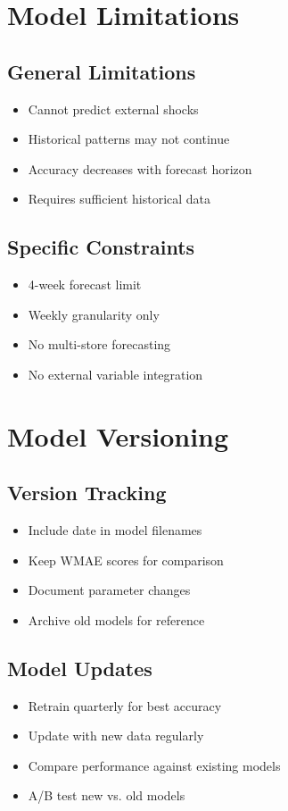 \section{Model Limitations}

\subsection{General Limitations}
\begin{itemize}
	\item Cannot predict external shocks
	\item Historical patterns may not continue
	\item Accuracy decreases with forecast horizon
	\item Requires sufficient historical data
\end{itemize}

\subsection{Specific Constraints}
\begin{itemize}
	\item 4-week forecast limit
	\item Weekly granularity only
	\item No multi-store forecasting
	\item No external variable integration
\end{itemize}

\section{Model Versioning}

\subsection{Version Tracking}
\begin{itemize}
	\item Include date in model filenames
	\item Keep WMAE scores for comparison
	\item Document parameter changes
	\item Archive old models for reference
\end{itemize}

\subsection{Model Updates}
\begin{itemize}
	\item Retrain quarterly for best accuracy
	\item Update with new data regularly
	\item Compare performance against existing models
	\item A/B test new vs. old models
\end{itemize}